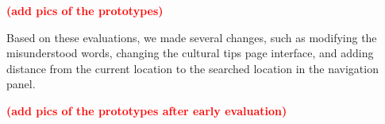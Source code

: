 \textbf{\textcolor{red}{(add pics of the prototypes)}}

Based on these evaluations, we made several changes, such as modifying the misunderstood words, changing the cultural tips page interface, and adding distance from the current location to the searched location in the navigation panel.

\textbf{\textcolor{red}{(add pics of the prototypes after early evaluation)}}

